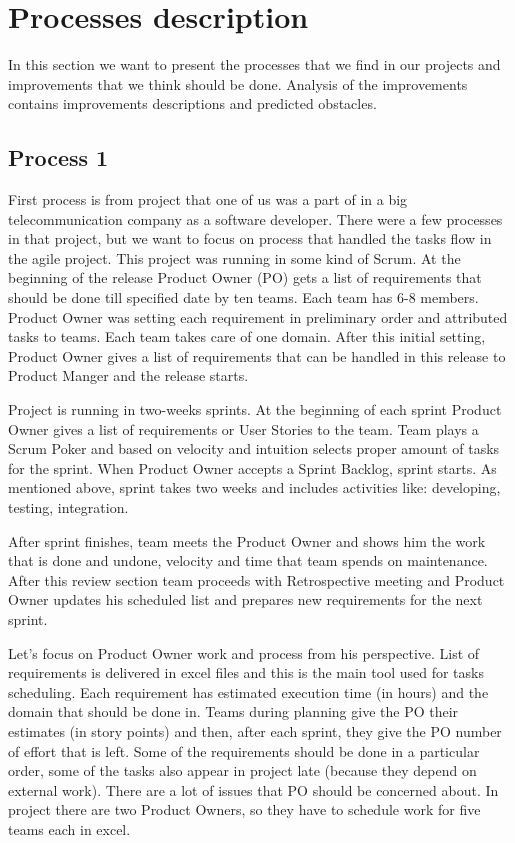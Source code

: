 \section{Processes description}

In this section we want to present the processes that we find in our projects and improvements that we think should be done. Analysis of the improvements contains improvements descriptions and predicted obstacles.

\subsection*{Process 1}

First process is from project that one of us was a part of in a big telecommunication company as a software developer. There were a few processes in that project, but we want to focus on process that handled the tasks flow in the agile project. This project was running in some kind of Scrum. At the beginning of the release Product Owner (PO) gets a list of requirements that should be done till specified date by ten teams. Each team has 6-8 members. Product Owner was setting each requirement in preliminary order and attributed tasks to teams. Each team takes care of one domain. After this initial setting, Product Owner gives a list of requirements that can be handled in this release to Product Manger and the release starts.

Project is running in two-weeks sprints. At the beginning of each sprint Product Owner gives a list of requirements or User Stories to the team. Team plays a Scrum Poker and based on velocity and intuition selects proper amount of tasks for the sprint. When Product Owner accepts a Sprint Backlog, sprint starts. As mentioned above, sprint takes two weeks and includes activities like: developing, testing, integration. 

After sprint finishes, team meets the Product Owner and shows him the work that is done and undone, velocity and time that team spends on maintenance. After this review section team proceeds with Retrospective meeting and Product Owner updates his scheduled list and prepares new requirements for the next sprint.

Let's focus on Product Owner work and process from his perspective. List of requirements is delivered in excel files and this is the main tool used for tasks scheduling. Each requirement has estimated execution time (in hours) and the domain that should be done in. Teams during planning give the PO their estimates (in story points) and then, after each sprint, they give the PO number of effort that is left. Some of the requirements should be done in a particular order, some of the tasks also appear in project late (because they depend on external work). There are a lot of issues that PO should be concerned about. In project there are two Product Owners, so they have to schedule work for five teams each in excel.

